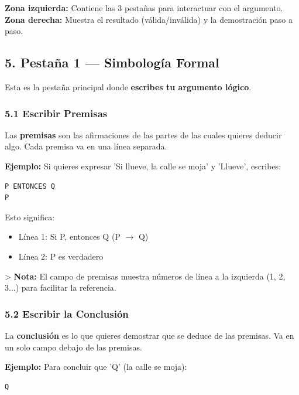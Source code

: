 \documentclass[11pt,a4paper]{article}
\begin{document}
\textbf{Zona izquierda:} Contiene las 3 pestañas para interactuar con el argumento.
\textbf{Zona derecha:} Muestra el resultado (válida/inválida) y la demostración paso a paso.

\hrulefill

\subsection{5. Pestaña 1 --- Simbología Formal}

Esta es la pestaña principal donde \textbf{escribes tu argumento lógico}.

\subsubsection{5.1 Escribir Premisas}

Las \textbf{premisas} son las afirmaciones de las partes de las cuales quieres deducir algo. Cada premisa va en una línea separada.

\textbf{Ejemplo:} Si quieres expresar 'Si llueve, la calle se moja' y 'Llueve', escribes:

\begin{lstlisting}[language={},basicstyle=\ttfamily\scriptsize]
P ENTONCES Q
P
\end{lstlisting}

Esto significa:
\begin{itemize}[leftmargin=*]
\item Línea 1: Si P, entonces Q (P $ \to $ Q)
\item Línea 2: P es verdadero
\end{itemize}

> \textbf{Nota:} El campo de premisas muestra números de línea a la izquierda (1, 2, 3...) para facilitar la referencia.

\subsubsection{5.2 Escribir la Conclusión}

La \textbf{conclusión} es lo que quieres demostrar que se deduce de las premisas. Va en un solo campo debajo de las premisas.

\textbf{Ejemplo:} Para concluir que 'Q' (la calle se moja):

\begin{lstlisting}[language={},basicstyle=\ttfamily\scriptsize]
 Q
\end{lstlisting}
\end{document}
